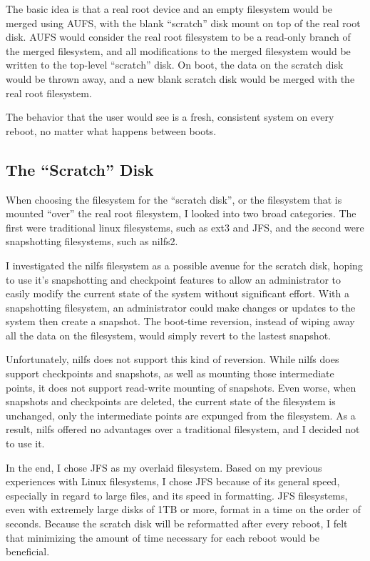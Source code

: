 \documentclass[12pt]{article}
\begin{document}
The basic idea is that a real root device and an empty filesystem would be
merged using AUFS, with the blank ``scratch'' disk mount on top of the real
root disk.  AUFS would consider the real root filesystem to be a read-only
branch of the merged filesystem, and all modifications to the merged filesystem
would be written to the top-level ``scratch'' disk. On boot, the data on the
scratch disk would be thrown away, and a new blank scratch disk would be merged
with the real root filesystem.

The behavior that the user would see is a fresh, consistent system on every
reboot, no matter what happens between boots.

\subsection{The ``Scratch'' Disk}
When choosing the filesystem for the ``scratch disk'', or the filesystem that
is mounted ``over'' the real root filesystem, I looked into two broad
categories.  The first were traditional linux filesystems, such as ext3 and
JFS, and the second were snapshotting filesystems, such as nilfs2.  

I investigated the nilfs filesystem as a possible avenue for the scratch disk,
hoping to use it's snapshotting and checkpoint features to allow an
administrator to easily modify the current state of the system without
significant effort.  With a snapshotting filesystem, an administrator could
make changes or updates to the system then create a snapshot.  The boot-time
reversion, instead of wiping away all the data on the filesystem, would simply
revert to the lastest snapshot.

Unfortunately, nilfs does not support this kind of reversion.  While nilfs does
support checkpoints and snapshots, as well as mounting those intermediate
points, it does not support read-write mounting of snapshots.  Even worse, when
snapshots and checkpoints are deleted, the current state of the filesystem is
unchanged, only the intermediate points are expunged from the filesystem. As a
result, nilfs offered no advantages over a traditional filesystem, and I
decided not to use it.

In the end, I chose JFS as my overlaid filesystem.  Based on my previous
experiences with Linux filesystems, I chose JFS because of its general speed,
especially in regard to large files, and its speed in formatting.  JFS
filesystems, even with extremely large disks of 1TB or more, format in a time
on the order of seconds.  Because the scratch disk will be reformatted after
every reboot, I felt that minimizing the amount of time necessary for each
reboot would be beneficial.
\end{document}
